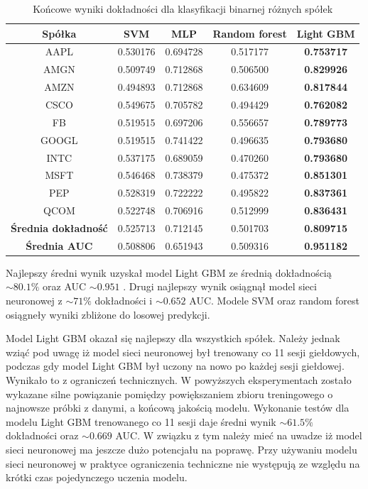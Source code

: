 \documentclass[a4paper, twoside, 11pt, openright]{article}
\begin{document}
 \begin{table}[H]
    \centering
    \begin{tabular}{|c|c|c|c|c|}
    \hline
        \textbf{Spółka} & \textbf{SVM} &  \textbf{MLP}  &  \textbf{Random forest}  &  \textbf{Light GBM} \\ \hline
AAPL   &  0.530176 & 0.694728  & 0.517177 & \textbf{0.753717}\\ \hline
AMGN   &  0.509749 &  0.712868 & 0.506500 &  \textbf{0.829926} \\ \hline
AMZN   &  0.494893 & 0.712868 & 0.634609 & \textbf{0.817844} \\ \hline
CSCO   &  0.549675 &  0.705782 & 0.494429 &  \textbf{0.762082} \\ \hline
FB     &  0.519515 & 0.697206 & 0.556657 & \textbf{0.789773} \\ \hline
GOOGL  &  0.519515 &  0.741422 & 0.496635 & \textbf{0.793680} \\ \hline
INTC   &  0.537175 & 0.689059  & 0.470260 & \textbf{0.793680} \\ \hline
MSFT   &  0.546468 & 0.738379 & 0.475372 &  \textbf{0.851301}\\ \hline
PEP    &  0.528319 & 0.722222  & 0.495822 & \textbf{0.837361} \\ \hline
QCOM   &  0.522748 &  0.706916 & 0.512999 & \textbf{0.836431} \\ \hline \hline
\textbf{Średnia dokładność} &  0.525713 & 0.712145 & 0.501703 & \textbf{0.809715} \\  \hline  
\textbf{Średnia AUC} &  0.508806 & 0.651943 & 0.509316 & \textbf{0.951182} \\  \hline
    \end{tabular}
    \caption{Końcowe wyniki dokładności dla klasyfikacji binarnej różnych spółek}
    \label{tab:comparison_final_binary}
\end{table}   

Najlepszy średni wynik uzyskał model Light GBM ze średnią dokładnością $\sim 80.1\%$ oraz AUC $\sim 0.951$ . Drugi najlepszy wynik osiągnął model sieci neuronowej z  $\sim 71\%$ dokładności i $\sim 0.652$ AUC. Modele SVM oraz random forest osiągneły wyniki zbliżone do losowej predykcji.

\bigskip

Model Light GBM okazał się najlepszy dla wszystkich spółek. Należy jednak wziąć pod uwagę iż model sieci neuronowej był trenowany co 11 sesji giełdowych, podczas gdy model Light GBM był uczony na nowo po każdej sesji giełdowej. Wynikało to z ograniczeń technicznych. W powyższych eksperymentach zostało wykazane silne powiązanie pomiędzy powiększaniem zbioru treningowego o najnowsze próbki z danymi, a końcową jakością modelu. Wykonanie testów dla modelu Light GBM trenowanego co 11 sesji daje średni wynik $\sim 61.5\%$ dokładności oraz $\sim 0.669$ AUC. W związku z tym należy mieć na uwadze iż model sieci neuronowej ma jeszcze dużo potencjału na poprawę. Przy używaniu modelu sieci neuronowej w praktyce ograniczenia techniczne nie występują ze względu na krótki czas pojedynczego uczenia modelu.
\end{document}

